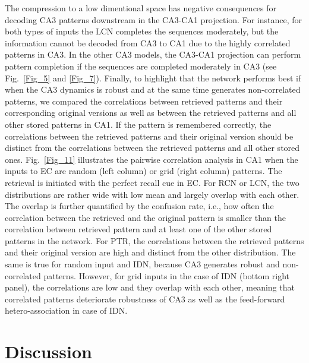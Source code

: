 \documentclass[utf8]{frontiersSCNS} %
\begin{document}
The compression to a low dimentional space has negative consequences for decoding CA3 patterns downstream in the CA3-CA1 projection. For instance, for both types of inputs the LCN completes the sequences moderately, but the information cannot be decoded from CA3 to CA1 due to the highly correlated patterns in CA3. In the other CA3 models, the CA3-CA1 projection can perform pattern completion if the sequences are completed moderately in CA3 (see Fig.~\ref{Fig_5} and \ref{Fig_7}). Finally, to highlight that the network performs best if when the CA3 dynamics is robust and at the same time generates non-correlated patterns, we compared the correlations between retrieved patterns and their corresponding original versions as well as between the retrieved patterns and all other stored patterns in CA1. If the pattern is remembered correctly, the correlations between the retrieved patterns and their original version should be distinct from the correlations between the retrieved patterns and all other stored ones. Fig.~\ref{Fig_11} illustrates the pairwise correlation analysis in CA1 when the inputs to EC are random (left column) or grid (right column) patterns. The retrieval is initiated with the perfect recall cue in EC. For RCN or LCN, the two distributions are rather wide with low mean and largely overlap with each other. The overlap is further quantified by the confusion rate, i.e., how often the correlation between the retrieved and the original pattern is smaller than the correlation between retrieved pattern and at least one of the other stored patterns in the network. For PTR, the correlations between the retrieved patterns and their original version are high and distinct from the other distribution. The same is true for random input and IDN, because CA3 generates robust and non-correlated patterns. However, for grid inputs in the case of IDN (bottom right panel), the correlations are low and they overlap with each other, meaning that correlated patterns deteriorate robustness of CA3 as well as the feed-forward hetero-association in case of IDN.    





\section{Discussion}
\end{document}
